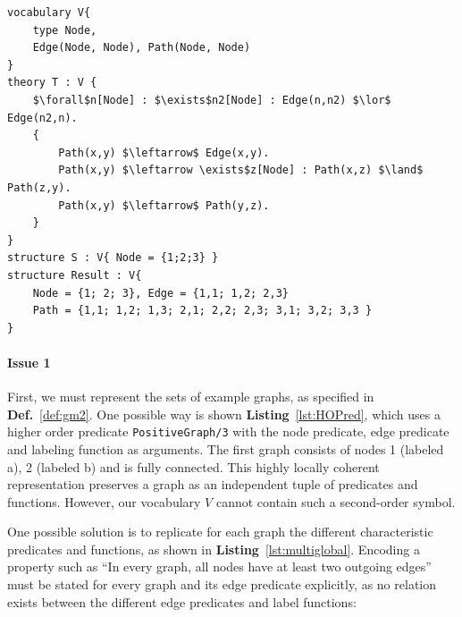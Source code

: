 \begin{lstlisting}[mathescape,style=model,caption={IDP example using inductive definitions}, label=lst:vocabularyExample]
vocabulary V{
    type Node, 
    Edge(Node, Node), Path(Node, Node)
}
theory T : V {
    $\forall$n[Node] : $\exists$n2[Node] : Edge(n,n2) $\lor$ Edge(n2,n).
    {
        Path(x,y) $\leftarrow$ Edge(x,y).
        Path(x,y) $\leftarrow \exists$z[Node] : Path(x,z) $\land$ Path(z,y).
        Path(x,y) $\leftarrow$ Path(y,z).
    }
}
structure S : V{ Node = {1;2;3} }
structure Result : V{
    Node = {1; 2; 3}, Edge = {1,1; 1,2; 2,3}
    Path = {1,1; 1,2; 1,3; 2,1; 2,2; 2,3; 3,1; 3,2; 3,3 }
}
\end{lstlisting}


\paragraph{Issue 1}
First, we must represent the sets of example graphs, as specified in \textbf{Def.}~\ref{def:gm2}.
One possible way is shown \textbf{Listing}~\ref{lst:HOPred}, which uses a higher order predicate \lstinline{PositiveGraph/3} with the node predicate, edge predicate and labeling function as arguments. 
The first graph consists of nodes 1 (labeled a), 2 (labeled b) and is fully connected.
This highly locally coherent representation preserves a graph as an independent tuple of predicates and functions.
However, our vocabulary $V$ cannot contain such a second-order symbol.

One possible solution is to replicate for each graph the different characteristic predicates and functions, as shown in \textbf{Listing}~\ref{lst:multiglobal}.
Encoding a property such as ``In every graph, all nodes have at least two outgoing edges'' must be stated for every graph and its edge predicate explicitly, as no relation exists between the different edge predicates and label functions:

